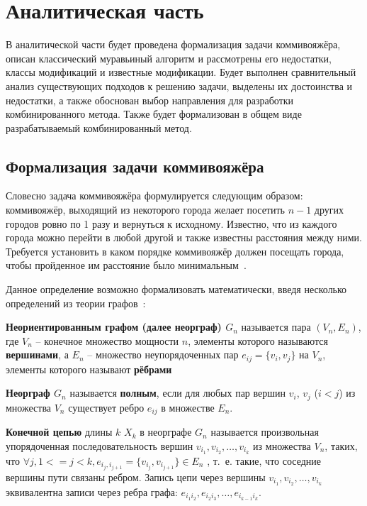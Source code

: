 \chapter{Аналитическая часть}

В аналитической части будет проведена формализация задачи коммивояжёра, описан классический муравьиный алгоритм и рассмотрены его недостатки, классы модификаций и известные модификации. Будет выполнен сравнительный анализ существующих подходов к решению задачи, выделены их достоинства и недостатки, а также обоснован выбор направления для разработки комбинированного метода. Также будет формализован в общем виде разрабатываемый комбинированный метод.

\section{Формализация задачи коммивояжёра}

Словесно задача коммивояжёра формулируется следующим образом: коммивояжёр, выходящий из некоторого города желает посетить $n - 1$ других городов ровно по 1 разу и вернуться к исходному. Известно, что из каждого города можно перейти в любой другой и также известны расстояния между ними. Требуется установить в каком порядке коммивояжёр должен посещать города, чтобы пройденное им расстояние было минимальным~\cite{mudrov}.

Данное определение возможно формализовать математически, введя несколько определений из теории графов~\cite{belousev}:

\textbf{Неориентированным графом (далее неорграф) $G_n$} называется пара $(V_n, E_n)$, где $V_n$ -- конечное множество мощности $n$, элементы которого называются \textbf{вершинами}, а $E_n$ -- множество неупорядоченных пар $e_{ij} = \{v_i, v_j\}$ на $V_n$, элементы которого называют \textbf{рёбрами}
           
\textbf{Неорграф $G_n$} называется \textbf{полным}, если для любых пар вершин $v_i$, $v_j$ ($i < j$) из множества $V_n$ существует ребро $e_{ij}$ в множестве $E_n$.

\textbf{Конечной цепью} длины $k$ $X_k$ в неорграфе $G_n$ называется произвольная упорядоченная последовательность вершин $v_{i_1}, v_{i_2}, \dots, v_{i_k}$ из множества $V_n$, таких, что $\forall j, 1 <= j < k, e_{i_j, i_{j+1}} = \{v_{i_j}, v_{i_{j + 1}}\} \in E_n$ , т.~е. такие, что соседние вершины пути связаны ребром. Запись цепи через вершины $v_{i_1}, v_{i_2}, \dots, v_{i_k}$ эквивалентна записи через ребра графа: $e_{i_1i_2}, e_{i_2i_3}, \dots, e_{i_{k-1}i_k}$.

